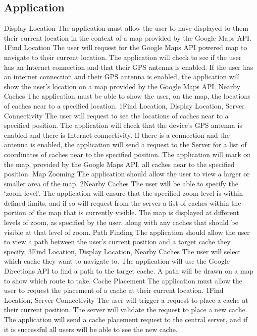 	\subsection{Application}
		\funcreq
			{Display Location}
			{The application must allow the user to have displayed to them
			their current location in the context of a map provided by the
			Google Maps API.}
			{1}{Find Location}
			{The user will request for the Google Maps API powered map to 
			navigate to their current location.}
			{The application will check to see if the user has an Internet 
			connection and that their GPS antenna is enabled.}
			{If the user has an internet connection and their GPS antenna is 
			enabled, the application will show the user's location on a map 
			provided by the Google Maps API.}
		\funcreq
			{Nearby Caches}
			{The application must be able to show the user, on the map, the 
			locations of caches near to a specified location.}
			{1}{Find Location, Display Location, Server Connectivity}
			{The user will request to see the locations of caches near to
			a specified position.}
			{The application will check that the device's GPS antenna is 
			enabled and there is Internet connectivity. If there is a
			connection and the antenna is enabled, the application will send a
			request to the Server for a list of coordinates of caches near to
			the specified position.}
			{The application will mark on the map, provided by the Google Maps 
			API, all caches near to the specified position.}
		\funcreq
			{Map Zooming}
			{The application should allow the user to view a larger or smaller 
			area of the map.}
			{2}{Nearby Caches}
			{The user will be able to specify the `zoom level'.}
			{The application will ensure that the specified zoom level is
			within defined limits, and if so will request from the server a
			list of caches within the portion of the map that is currently
			visible.}
			{The map is displayed at different levels of zoom, as specified by 
			the user, along with any caches that should be visible at that
			level of zoom.}
		\funcreq
			{Path Finding}
			{The application should allow the user to view a path between the 
			user's current position and a target cache they specify.}
			{3}{Find Location, Display Location, Nearby Caches}
			{The user will select which cache they want to navigate to.}
			{The application will use the Google Directions API to find a path 
			to the target cache.}
			{A path will be drawn on a map to show which route to take.}
		\funcreq
			{Cache Placement}
			{The application must allow the user to request the placement of a 
			cache at their current location.}
			{1}{Find Location, Server Connectivity}
			{The user will trigger a request to place a cache at their current 
			position.}
			{The server will validate the request to place a new cache.}
			{The application will send a cache placement request to the 
			central server, and if it is successful all users will be able to 
			see the new cache.}
